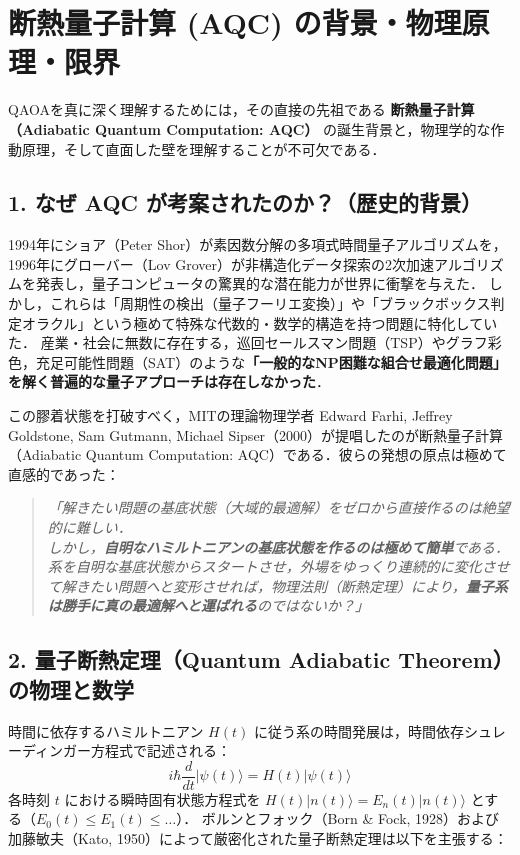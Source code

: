 \documentclass[11pt,a4paper,oneside,openany]{ltjsbook}
\theoremstyle{definition}
\theoremstyle{plain}
\theoremstyle{remark}
\newcommand{\ket}[1]{|#1\rangle}
\begin{document}
\section{断熱量子計算 (AQC) の背景・物理原理・限界}
\label{sec:aqc_detailed}

QAOAを真に深く理解するためには，その直接の先祖である \textbf{断熱量子計算（Adiabatic Quantum Computation: AQC）} の誕生背景と，物理学的な作動原理，そして直面した壁を理解することが不可欠である．

\subsection{1. なぜ AQC が考案されたのか？（歴史的背景）}
1994年にショア（Peter Shor）が素因数分解の多項式時間量子アルゴリズムを，1996年にグローバー（Lov Grover）が非構造化データ探索の2次加速アルゴリズムを発表し，量子コンピュータの驚異的な潜在能力が世界に衝撃を与えた．
しかし，これらは「周期性の検出（量子フーリエ変換）」や「ブラックボックス判定オラクル」という極めて特殊な代数的・数学的構造を持つ問題に特化していた．
産業・社会に無数に存在する，巡回セールスマン問題（TSP）やグラフ彩色，充足可能性問題（SAT）のような\textbf{「一般的なNP困難な組合せ最適化問題」を解く普遍的な量子アプローチは存在しなかった}．

この膠着状態を打破すべく，MITの理論物理学者 Edward Farhi, Jeffrey Goldstone, Sam Gutmann, Michael Sipser（2000）が提唱したのが断熱量子計算（Adiabatic Quantum Computation: AQC）である\cite{farhi2000quantum,farhi2001quantum}．彼らの発想の原点は極めて直感的であった：
\begin{quote}
\textit{「解きたい問題の基底状態（大域的最適解）をゼロから直接作るのは絶望的に難しい．\\
しかし，\textbf{自明なハミルトニアンの基底状態を作るのは極めて簡単}である．\\
系を自明な基底状態からスタートさせ，外場をゆっくり連続的に変化させて解きたい問題へと変形させれば，物理法則（断熱定理）により，\textbf{量子系は勝手に真の最適解へと運ばれる}のではないか？」}
\end{quote}

\subsection{2. 量子断熱定理（Quantum Adiabatic Theorem）の物理と数学}
時間に依存するハミルトニアン $H(t)$ に従う系の時間発展は，時間依存シュレーディンガー方程式で記述される：
\begin{equation}
    i \hbar \frac{d}{dt} \ket{\psi(t)} = H(t) \ket{\psi(t)}
\end{equation}
各時刻 $t$ における瞬時固有状態方程式を $H(t)\ket{n(t)} = E_n(t)\ket{n(t)}$ とする（$E_0(t) \le E_1(t) \le \dots$）．
ボルンとフォック（Born \& Fock, 1928）\cite{born1928beweis}および加藤敏夫（Kato, 1950）\cite{kato1950adiabatic}によって厳密化された量子断熱定理は以下を主張する：
\end{document}
